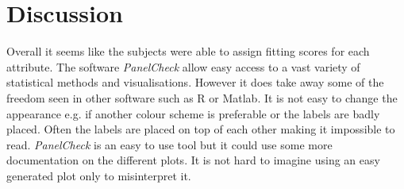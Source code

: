 \section*{Discussion}
\label{discussion}
Overall it seems like the subjects were able to assign fitting scores for each attribute. The software  \textit{PanelCheck} allow easy access to a vast variety of statistical methods and visualisations. However it does take away some of the freedom seen in other software such as R or Matlab. It is not easy to change the appearance e.g. if another colour scheme is preferable or the labels are badly placed. Often the labels are placed on top of each other making it impossible to read. \textit{PanelCheck} is an easy to use tool but it could use some more documentation on the different plots. It is not hard to imagine using an easy generated plot only to misinterpret it. 